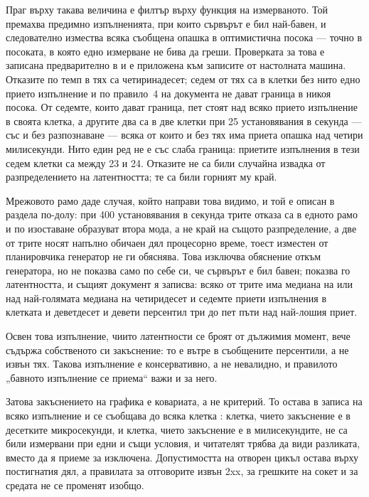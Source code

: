 Праг върху такава величина е филтър върху функция на измерваното. Той премахва предимно
изпълненията, при които сървърът е бил най-бавен, и следователно измества всяка съобщена опашка в
оптимистична посока — точно в посоката, в която едно измерване не бива да греши. Проверката за
това е записана предварително в  и е приложена към записите от
настолната машина. Отказите по темп в тях са четиринадесет; седем от тях са в клетки без нито
едно прието изпълнение и по правило~4 на документа не дават граница в никоя посока. От седемте,
които дават граница, пет стоят над всяко прието изпълнение в своята клетка, а другите два са в
две клетки при 25 установявания в секунда — със и без разпознаване — всяка от които и без тях
има приета опашка над четири милисекунди. Нито един ред не е със слаба граница: приетите
изпълнения в тези седем клетки са между 23 и 24. Отказите не са били случайна извадка от
разпределението на латентността; те са били горният му край.

Мрежовото рамо даде случая, който направи това видимо, и той е описан в раздела по-долу: при 400
установявания в секунда трите отказа са в едното рамо и по изоставане образуват втора мода, а не
край на същото разпределение, а две от трите носят напълно обичаен дял процесорно време, тоест
изместен от планировчика генератор не ги обяснява. Това изключва обяснение откъм генератора, но
не показва само по себе си, че сървърът е бил бавен; показва го латентността, и същият документ
я записва: всяко от трите има медиана на или над най-голямата медиана на четиридесет и седемте
приети изпълнения в клетката и деветдесет и девети персентил три до пет пъти над най-лошия приет.

Освен това изпълнение, чиито латентности се броят от дължимия момент, вече съдържа собственото си
закъснение: то е вътре в съобщените персентили, а не извън тях. Такова изпълнение е консервативно,
а не невалидно, и правилото „бавното изпълнение се приема“ важи и за него.

Затова закъснението на графика е ковариата, а не критерий. То остава в записа на всяко изпълнение
и се съобщава до всяка клетка : клетка, чието закъснение е в десетките
микросекунди, и клетка, чието закъснение е в милисекундите, не са били измервани при едни и същи
условия, и читателят трябва да види разликата, вместо да я приеме за изключена. Допустимостта на
отворен цикъл остава върху постигнатия дял, а правилата за отговорите извън 2xx, за грешките на
сокет и за средата не се променят изобщо.

